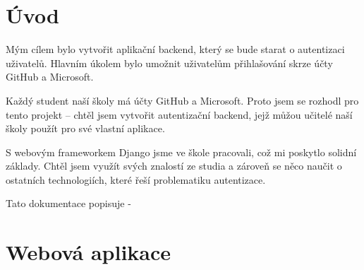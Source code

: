 \documentclass[12pt, a4paper,
twoside,        %
openright
]{report}
\begin{document}
	\chapter*{Úvod}
Mým cílem bylo vytvořit aplikační backend, který se bude starat o autentizaci uživatelů. Hlavním úkolem bylo umožnit uživatelům přihlašování skrze účty GitHub a Microsoft.


\noindent Každý student naší školy má účty GitHub a Microsoft. Proto jsem se rozhodl pro tento projekt – chtěl jsem vytvořit autentizační backend, jejž můžou učitelé naší školy použít pro své vlastní aplikace.


\noindent S webovým frameworkem Django jsme ve škole pracovali, což mi poskytlo solidní základy. Chtěl jsem využít svých znalostí ze studia a zároveň se něco naučit o ostatních technologiích, které řeší problematiku autentizace.


\noindent Tato dokumentace popisuje -



\chapter{Webová aplikace}
\end{document}
